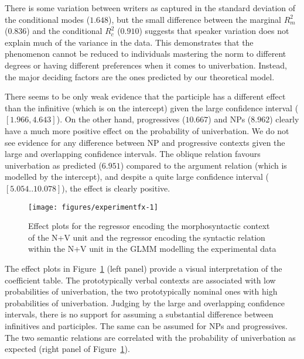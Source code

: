 \documentclass[biblatex, charis, linguex]{glossa}\usepackage{knitr}
\begin{document}
There is some variation between writers as captured in the standard deviation of the conditional modes ($1.648$), but the small difference between the marginal $R^2_m$ ($0.836$) and the conditional $R^2_c$ ($0.910$) suggests that speaker variation does not explain much of the variance in the data.
This demonstrates that the phenomenon cannot be reduced to individuals mastering the norm to different degrees or having different preferences when it comes to univerbation.
Instead, the major deciding factors are the ones predicted by our theoretical model.

There seems to be only weak evidence that the participle has a different effect than the infinitive (which is on the intercept) given the large confidence interval ($[1.966, 4.643]$).
On the other hand, progressives ($10.667$) and NPs ($8.962$) clearly have a much more positive effect on the probability of univerbation.
We do not see evidence for any difference between NP and progressive contexts given the large and overlapping confidence intervals.
The oblique relation favours univerbation as predicted ($6.951$) compared to the argument relation (which is modelled by the intercept), and despite a quite large confidence interval ($[5.054..10.078]$), the effect is clearly positive.

\begin{figure}[htbp]

{\centering \texttt{[image: figures/experimentfx-1]} 

}

\caption[Effect plots for the regressor encoding the morphosyntactic context of the N+V unit and the regressor encoding the syntactic relation within the N+V unit in the GLMM modelling the experimental data]{Effect plots for the regressor encoding the morphosyntactic context of the N+V unit and the regressor encoding the syntactic relation within the N+V unit in the GLMM modelling the experimental data}\label{fig:experimentfx}
\end{figure}


The effect plots in Figure~\ref{fig:experimentfx} (left panel) provide a visual interpretation of the coefficient table.
The prototypically verbal contexts are associated with low probabilities of univerbation, the two prototypically nominal ones with high probabilities of univerbation.
Judging by the large and overlapping confidence intervals, there is no support for assuming a substantial difference between infinitives and participles.
The same can be assumed for NPs and progressives.
The two semantic relations are correlated with the probability of univerbation as expected (right panel of Figure~\ref{fig:experimentfx}).
\end{document}
